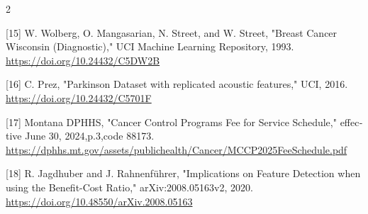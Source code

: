 \documentclass[10pt,a4paper]{article}
\begin{document}
\begin{multicols}{2}
\begin{minipage}{\linewidth}{\fontsize{7}{8.2}\selectfont \begin{latin}[15] W. Wolberg, O. Mangasarian, N. Street, and W. Street, "Breast Cancer Wisconsin (Diagnostic)," UCI Machine Learning Repository, 1993. \url{https://doi.org/10.24432/C5DW2B}\end{latin}\par}\end{minipage}\par
\begin{minipage}{\linewidth}{\fontsize{7}{8.2}\selectfont \begin{latin}[16] C. Prez, "Parkinson Dataset with replicated acoustic features," UCI, 2016. \url{https://doi.org/10.24432/C5701F}\end{latin}\par}\end{minipage}\par
\begin{minipage}{\linewidth}{\fontsize{7}{8.2}\selectfont \begin{latin}[17] Montana DPHHS, "Cancer Control Programs Fee for Service Schedule," effective June 30, 2024,p.3,code 88173. \url{https://dphhs.mt.gov/assets/publichealth/Cancer/MCCP2025FeeSchedule.pdf}\end{latin}\par}\end{minipage}\par
\begin{minipage}{\linewidth}{\fontsize{7}{8.2}\selectfont \begin{latin}[18] R. Jagdhuber and J. Rahnenführer, "Implications on Feature Detection when using the Benefit-Cost Ratio," arXiv:2008.05163v2, 2020. \url{https://doi.org/10.48550/arXiv.2008.05163}\end{latin}\par}\end{minipage}\par
\end{multicols}
\end{document}
